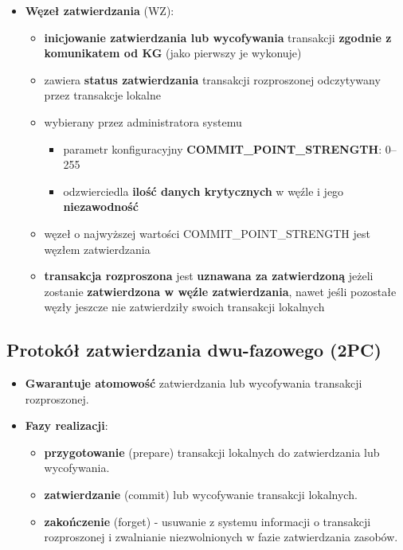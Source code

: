 \documentclass[a4paper]{article}
\begin{document}
\begin{itemize}[noitemsep]
\begin{itemize}[noitemsep]
            \item \textbf{Węzeł zatwierdzania} (WZ):
            \begin{itemize}[noitemsep]
                \item \textbf{inicjowanie zatwierdzania lub wycofywania} transakcji \textbf{zgodnie z komunikatem od KG}
                (jako pierwszy je wykonuje)
                \item zawiera \textbf{status zatwierdzania} transakcji rozproszonej odczytywany przez transakcje lokalne
                \item wybierany przez administratora systemu
                \begin{itemize}[noitemsep]
                    \item parametr konfiguracyjny \textbf{COMMIT\_POINT\_STRENGTH}: 0--255
                    \item odzwierciedla \textbf{ilość danych krytycznych} w węźle i jego \textbf{niezawodność}
                \end{itemize}
                \item węzeł o najwyższej wartości COMMIT\_POINT\_STRENGTH jest węzłem zatwierdzania
                \item \textbf{transakcja rozproszona} jest \textbf{uznawana za zatwierdzoną} jeżeli zostanie
                \textbf{zatwierdzona w węźle zatwierdzania}, nawet jeśli pozostałe węzły jeszcze nie zatwierdziły
                swoich transakcji lokalnych
            \end{itemize}
        \end{itemize}
    \end{itemize}

    \subsection{Protokół zatwierdzania dwu-fazowego (2PC)}
    \begin{itemize}[noitemsep]
        \item \textbf{Gwarantuje atomowość} zatwierdzania lub wycofywania transakcji rozproszonej.
        \item \textbf{Fazy realizacji}:
        \begin{itemize}[noitemsep]
            \item \textbf{przygotowanie} (prepare) transakcji lokalnych do zatwierdzania lub wycofywania.
            \item \textbf{zatwierdzanie} (commit) lub wycofywanie transakcji lokalnych.
            \item \textbf{zakończenie} (forget) - usuwanie z systemu informacji o transakcji rozproszonej i
            zwalnianie niezwolnionych w fazie zatwierdzania zasobów.
        \end{itemize}
    \end{itemize}
\end{document}
